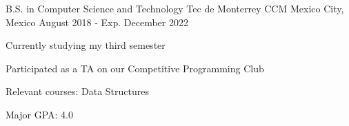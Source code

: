 

\begin{cventries}

  \cventry
    {B.S. in Computer Science and Technology} %
    {Tec de Monterrey CCM} %
    {Mexico City, Mexico} %
    {August 2018 - Exp. December 2022} %
    {
      \begin{cvitems} %
        \item {Currently studying my third semester}
        \item {Participated as a TA on our Competitive Programming Club}
        \item {Relevant courses: Data Structures}
        \item {Major GPA: 4.0}
      \end{cvitems}
    }

\end{cventries}
